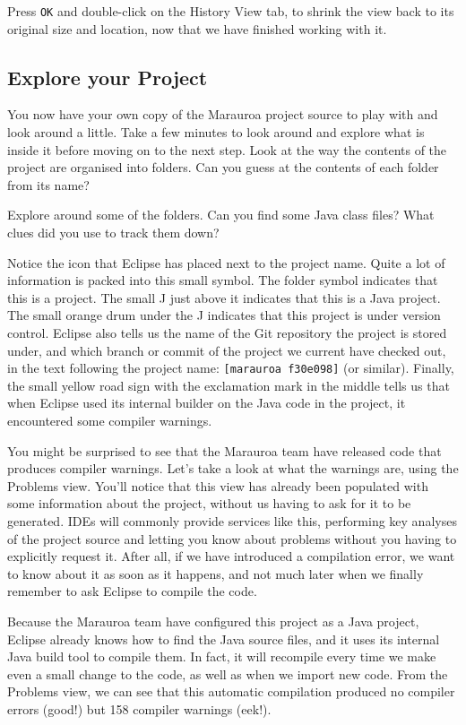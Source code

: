 \documentclass[
]{book}
\begin{document}
Press \texttt{OK} and double-click on the History View tab, to shrink the view back to its original size and location, now that we have finished working with it.

\hypertarget{explore}{%
\subsection{Explore your Project}\label{explore}}

You now have your own copy of the Marauroa project source to play with and look around a little. Take a few minutes to look around and explore what is inside it before moving on to the next step. Look at the way the contents of the project are organised into folders. Can you guess at the contents of each folder from its name?

Explore around some of the folders. Can you find some Java class files? What clues did you use to track them down?

Notice the icon that Eclipse has placed next to the project name. Quite a lot of information is packed into this small symbol. The folder symbol indicates that this is a project. The small J just above it indicates that this is a Java project. The small orange drum under the J indicates that this project is under version control. Eclipse also tells us the name of the Git repository the project is stored under, and which branch or commit of the project we current have checked out, in the text following the project name: \texttt{{[}marauroa\ f30e098{]}} (or similar). Finally, the small yellow road sign with the exclamation mark in the middle tells us that when Eclipse used its internal builder on the Java code in the project, it encountered some compiler warnings.

You might be surprised to see that the Marauroa team have released code that produces compiler warnings. Let's take a look at what the warnings are, using the Problems view. You'll notice that this view has already been populated with some information about the project, without us having to ask for it to be generated. IDEs will commonly provide services like this, performing key analyses of the project source and letting you know about problems without you having to explicitly request it. After all, if we have introduced a compilation error, we want to know about it as soon as it happens, and not much later when we finally remember to ask Eclipse to compile the code.

Because the Marauroa team have configured this project as a Java project, Eclipse already knows how to find the Java source files, and it uses its internal Java build tool to compile them. In fact, it will recompile every time we make even a small change to the code, as well as when we import new code. From the Problems view, we can see that this automatic compilation produced no compiler errors (good!) but 158 compiler warnings (eek!).
\end{document}
